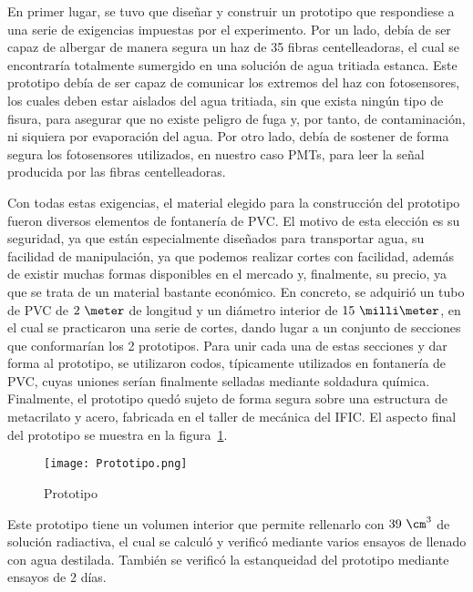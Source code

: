 En primer lugar, se tuvo que diseñar y construir un prototipo que respondiese a una serie de exigencias impuestas por el experimento. Por un lado,  debía de ser capaz de albergar de manera segura  un haz de 35 fibras centelleadoras, el cual se encontraría totalmente sumergido en una solución de agua tritiada estanca. Este prototipo debía de ser capaz de comunicar los extremos del haz con fotosensores, los cuales deben estar aislados del agua tritiada, sin que exista ningún tipo de fisura, para asegurar que no existe peligro de fuga y, por tanto, de contaminación, ni siquiera por evaporación del agua. Por otro lado, debía de sostener de forma segura los fotosensores utilizados, en nuestro caso PMTs, para leer la señal producida por las  fibras centelleadoras.

Con todas estas exigencias, el material elegido para la construcción del prototipo fueron diversos elementos de fontanería de PVC. El motivo de esta elección  es su seguridad, ya que están especialmente diseñados para transportar  agua, su facilidad de manipulación, ya que podemos realizar cortes con facilidad,  además de existir muchas formas disponibles en el mercado y, finalmente,  su precio, ya que se trata de un material bastante económico. 
En concreto, se adquirió un tubo de PVC de $2~\meter$ de longitud y un diámetro interior de $15~\milli\meter$, en el cual se practicaron una serie de cortes, dando lugar a un conjunto de secciones que conformarían los 2 prototipos. Para unir cada una de estas secciones y dar forma al prototipo, se utilizaron codos, típicamente utilizados en fontanería de PVC, cuyas uniones serían finalmente selladas mediante soldadura química. Finalmente, el prototipo quedó sujeto de forma segura sobre una estructura de metacrilato y acero, fabricada en el taller de mecánica del IFIC. El aspecto final del prototipo se muestra en la figura~\ref{prototipo}.
\begin{figure}[hbtp]
\centering
\texttt{[image: Prototipo.png]}
\caption{ Prototipo\label{prototipo}}
\end{figure}
Este prototipo tiene un volumen interior que permite rellenarlo con   $39~\cm^3$ de solución radiactiva, el cual se calculó y verificó mediante varios ensayos de llenado con agua destilada. También se verificó la estanqueidad del prototipo mediante ensayos de 2 días. 

